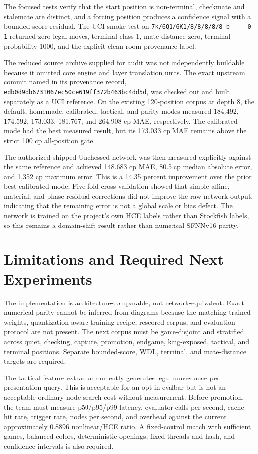 \documentclass[conference]{IEEEtran}
\begin{document}
The focused tests verify that the start position is non-terminal, checkmate and stalemate are distinct, and a forcing position produces a confidence signal with a bounded score residual. The UCI smoke test on \texttt{7k/6Q1/6K1/8/8/8/8/8 b - - 0 1} returned zero legal moves, terminal class 1, mate distance zero, terminal probability 1000, and the explicit clean-room provenance label.

The reduced source archive supplied for audit was not independently buildable because it omitted core engine and layer translation units. The exact upstream commit named in its provenance record, \texttt{edb0d9db6731067ec50ce619ff372b463bc4dd5d}, was checked out and built separately as a UCI reference. On the existing 120-position corpus at depth 8, the default, homemade, calibrated, tactical, and parity modes measured 184.492, 174.592, 173.033, 181.767, and 264.908 cp MAE, respectively. The calibrated mode had the best measured result, but its 173.033 cp MAE remains above the strict 100 cp all-position gate.

The authorized shipped Unchessed network was then measured explicitly against the same reference and achieved 148.683 cp MAE, 80.5 cp median absolute error, and 1,352 cp maximum error. This is a 14.35 percent improvement over the prior best calibrated mode. Five-fold cross-validation showed that simple affine, material, and phase residual corrections did not improve the raw network output, indicating that the remaining error is not a global scale or bias defect. The network is trained on the project's own HCE labels rather than Stockfish labels, so this remains a domain-shift result rather than numerical SFNNv16 parity.

\section{Limitations and Required Next Experiments}
The implementation is architecture-comparable, not network-equivalent. Exact numerical parity cannot be inferred from diagrams because the matching trained weights, quantization-aware training recipe, rescored corpus, and evaluation protocol are not present. The next corpus must be game-disjoint and stratified across quiet, checking, capture, promotion, endgame, king-exposed, tactical, and terminal positions. Separate bounded-score, WDL, terminal, and mate-distance targets are required.

The tactical feature extractor currently generates legal moves once per presentation query. This is acceptable for an opt-in evalbar but is not an acceptable ordinary-node search cost without measurement. Before promotion, the team must measure p50/p95/p99 latency, evaluator calls per second, cache hit rate, trigger rate, nodes per second, and overhead against the current approximately 0.8896 nonlinear/HCE ratio. A fixed-control match with sufficient games, balanced colors, deterministic openings, fixed threads and hash, and confidence intervals is also required.
\end{document}
